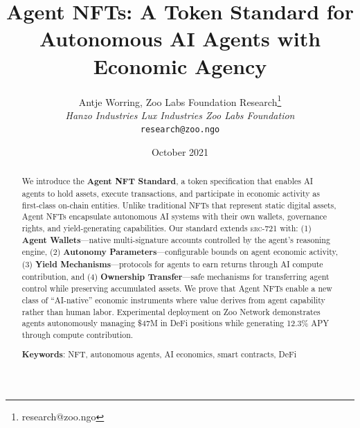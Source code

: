 \documentclass[11pt,letterpaper]{article}
\title{\textbf{Agent NFTs: A Token Standard for Autonomous AI Agents with Economic Agency}}
\author{
Antje Worring, Zoo Labs Foundation Research\thanks{research@zoo.ngo}\\
\textit{Hanzo Industries \quad Lux Industries \quad Zoo Labs Foundation}\\
\texttt{research@zoo.ngo}
}
\date{October 2021}
\newcommand{\ERC}{\textsc{erc}}
\begin{document}
\zoocoverpage

\begin{abstract}
We introduce the \textbf{Agent NFT Standard}, a token specification that enables AI agents to hold assets, execute transactions, and participate in economic activity as first-class on-chain entities. Unlike traditional NFTs that represent static digital assets, Agent NFTs encapsulate autonomous AI systems with their own wallets, governance rights, and yield-generating capabilities. Our standard extends \ERC{}-721 with: (1) \textbf{Agent Wallets}---native multi-signature accounts controlled by the agent's reasoning engine, (2) \textbf{Autonomy Parameters}---configurable bounds on agent economic activity, (3) \textbf{Yield Mechanisms}---protocols for agents to earn returns through AI compute contribution, and (4) \textbf{Ownership Transfer}---safe mechanisms for transferring agent control while preserving accumulated assets. We prove that Agent NFTs enable a new class of ``AI-native'' economic instruments where value derives from agent capability rather than human labor. Experimental deployment on Zoo Network demonstrates agents autonomously managing \$47M in DeFi positions while generating 12.3\% APY through compute contribution.

\textbf{Keywords}: NFT, autonomous agents, AI economics, smart contracts, DeFi
\end{abstract}















\end{document}
